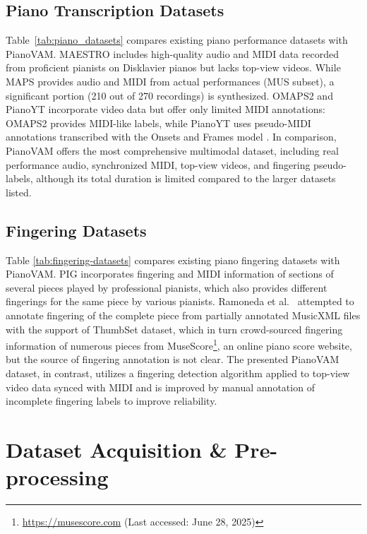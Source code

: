 \documentclass{article}
\begin{document}
\subsection{Piano Transcription Datasets}
Table~\ref{tab:piano_datasets} compares existing piano performance datasets with PianoVAM. MAESTRO \cite{ICLR19Hawthorne} includes high-quality audio and MIDI data recorded from proficient pianists on Disklavier pianos but lacks top-view videos. While MAPS \cite{Emiya2010} provides audio and MIDI from actual performances (MUS subset), a significant portion (210 out of 270 recordings) is synthesized. OMAPS2 \cite{ICASSPW23Li} and PianoYT \cite{ICASSP20Koepke} incorporate video data but offer only limited MIDI annotations: OMAPS2 provides MIDI-like labels, while PianoYT uses pseudo-MIDI annotations transcribed with the Onsets and Frames model \cite{ISMIR18Hawthorne}. In comparison, PianoVAM offers the most comprehensive multimodal dataset, including real performance audio, synchronized MIDI, top-view videos, and fingering pseudo-labels, although its total duration is limited compared to the larger datasets listed.


\subsection{Fingering Datasets}
Table \ref{tab:fingering-datasets} compares existing piano fingering datasets with PianoVAM. PIG \cite{InfoSci20Nakamura} incorporates fingering and MIDI information of sections of several pieces played by professional pianists, which also provides different fingerings for the same piece by various pianists. Ramoneda et al.~\cite{MM22Ramoneda} attempted to annotate fingering of the complete piece from partially annotated MusicXML files with the support of ThumbSet dataset, which in turn crowd-sourced fingering information of numerous pieces from MuseScore\footnote{\href{https://musescore.com}{https://musescore.com} (Last accessed: June 28, 2025)}, an online piano score website, but the source of fingering annotation is not clear. The presented PianoVAM dataset, in contrast, utilizes a fingering detection algorithm  applied to top-view video data synced with MIDI and is improved by manual annotation of incomplete fingering labels to improve reliability.  

\section{Dataset Acquisition \& Pre-processing}\label{sec:dataset-acquisition-preprocessing}
\end{document}
